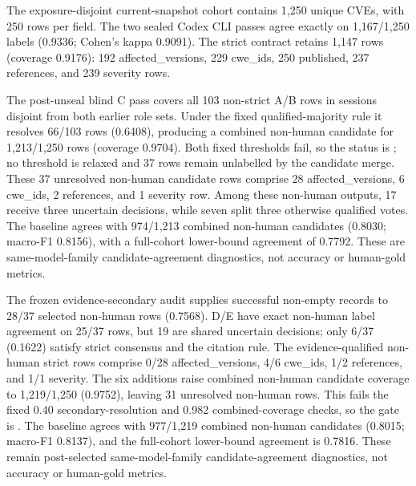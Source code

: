 The exposure-disjoint current-snapshot cohort contains 1,250 unique CVEs, with 250 rows per field. The two sealed Codex CLI passes agree exactly on 1,167/1,250 labels (0.9336; Cohen's kappa 0.9091). The strict contract retains 1,147 rows (coverage 0.9176): 192 affected\_versions, 229 cwe\_ids, 250 published, 237 references, and 239 severity rows.

The post-unseal blind C pass covers all 103 non-strict A/B rows in sessions disjoint from both earlier role sets. Under the fixed qualified-majority rule it resolves 66/103 rows (0.6408), producing a combined non-human candidate for 1,213/1,250 rows (coverage 0.9704). Both fixed thresholds fail, so the status is ; no threshold is relaxed and 37 rows remain unlabelled by the candidate merge. These 37 unresolved non-human candidate rows comprise 28 affected\_versions, 6 cwe\_ids, 2 references, and 1 severity row. Among these non-human outputs, 17 receive three uncertain decisions, while seven split three otherwise qualified votes. The baseline agrees with 974/1,213 combined non-human candidates (0.8030; macro-F1 0.8156), with a full-cohort lower-bound agreement of 0.7792. These are same-model-family candidate-agreement diagnostics, not accuracy or human-gold metrics.

The frozen evidence-secondary audit supplies successful non-empty records to 28/37 selected non-human rows (0.7568). D/E have exact non-human label agreement on 25/37 rows, but 19 are shared uncertain decisions; only 6/37 (0.1622) satisfy strict consensus and the citation rule. The evidence-qualified non-human strict rows comprise 0/28 affected\_versions, 4/6 cwe\_ids, 1/2 references, and 1/1 severity. The six additions raise combined non-human candidate coverage to 1,219/1,250 (0.9752), leaving 31 unresolved non-human rows. This fails the fixed 0.40 secondary-resolution and 0.982 combined-coverage checks, so the gate is . The baseline agrees with 977/1,219 combined non-human candidates (0.8015; macro-F1 0.8137), and the full-cohort lower-bound agreement is 0.7816. These remain post-selected same-model-family candidate-agreement diagnostics, not accuracy or human-gold metrics.

